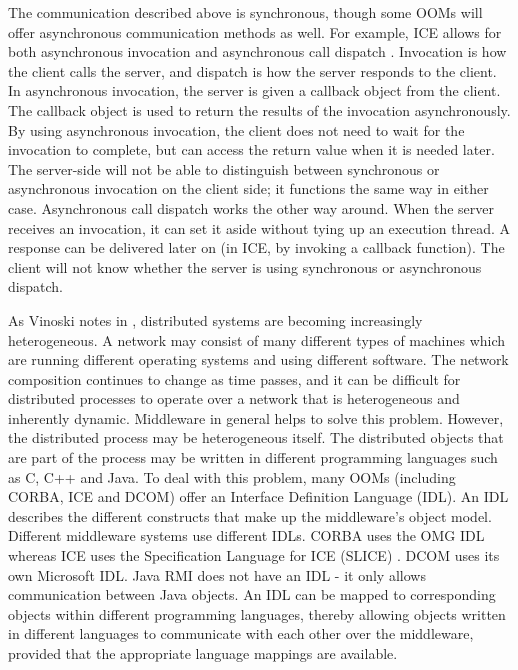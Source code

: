 \documentclass{acm_proc_article-sp}
\begin{document}
The communication described above is synchronous, though some OOMs will offer asynchronous communication methods as well.  For example, ICE allows for both asynchronous invocation and asynchronous call dispatch \cite{Henning:2004p8372}.  Invocation is how the client calls the server, and dispatch is how the server responds to the client.  In asynchronous invocation, the server is given a callback object from the client.  The callback object is used to return the results of the invocation asynchronously.  By using asynchronous invocation, the client does not need to wait for the invocation to complete, but can access the return value when it is needed later.  The server-side will not be able to distinguish between synchronous or asynchronous invocation on the client side; it functions the same way in either case.  Asynchronous call dispatch works the other way around.  When the server receives an invocation, it can set it aside without tying up an execution thread.  A response can be delivered later on (in ICE, by invoking a callback function).  The client will not know whether the server is using synchronous or asynchronous dispatch.

As Vinoski notes in \cite{Vinoski:2004p8371}, distributed systems are becoming increasingly heterogeneous.  A network may consist of many different types of machines which are running different operating systems and using different software.  The network composition continues to change as time passes, and it can be difficult for distributed processes to operate over a network that is heterogeneous and inherently dynamic.  Middleware in general helps to solve this problem.  However, the distributed process may be heterogeneous itself.  The distributed objects that are part of the process may be written in different programming languages such as C, C++ and Java.  To deal with this problem, many OOMs (including CORBA, ICE and DCOM) offer an Interface Definition Language (IDL).  An IDL describes the different constructs that make up the middleware's object model.  Different middleware systems use different IDLs.  CORBA uses the OMG IDL whereas ICE uses the Specification Language for ICE (SLICE) \cite{Henning:2004p8372}.  DCOM uses its own Microsoft IDL.  Java RMI does not have an IDL - it only allows communication between Java objects.  An IDL can be mapped to corresponding objects within different programming languages, thereby allowing objects written in different languages to communicate with each other over the middleware, provided that the appropriate language mappings are available.
\end{document}
